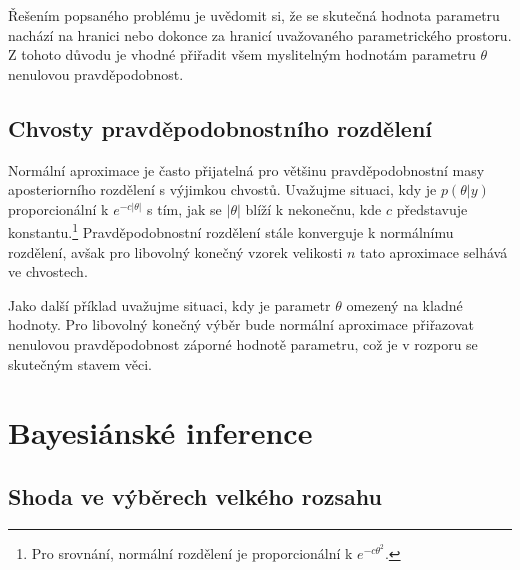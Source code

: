 Řešením popsaného problému je uvědomit si, že se skutečná hodnota parametru nachází na hranici nebo dokonce za hranicí uvažovaného parametrického prostoru. Z tohoto důvodu je vhodné přiřadit všem myslitelným hodnotám parametru $\theta$ nenulovou pravděpodobnost.

\subsection{Chvosty pravděpodobnostního rozdělení}

Normální aproximace je často přijatelná pro většinu pravděpodobnostní masy aposteriorního rozdělení s výjimkou chvostů. Uvažujme situaci, kdy je $p(\theta | y)$ proporcionální k $e^{-c|\theta|}$ s tím, jak se $|\theta|$ blíží k nekonečnu, kde $c$ představuje konstantu.\footnote{Pro srovnání, normální rozdělení je proporcionální k $e^{-c\theta^2}$.} Pravděpodobnostní rozdělení stále konverguje k normálnímu rozdělení, avšak pro libovolný konečný vzorek velikosti $n$ tato aproximace selhává ve chvostech.

Jako další příklad uvažujme situaci, kdy je parametr $\theta$ omezený na kladné hodnoty. Pro libovolný konečný výběr bude normální aproximace přiřazovat nenulovou pravděpodobnost záporné hodnotě parametru, což je v rozporu se skutečným stavem věci.

\section{Bayesiánské inference}

\subsection{Shoda ve výběrech velkého rozsahu}

